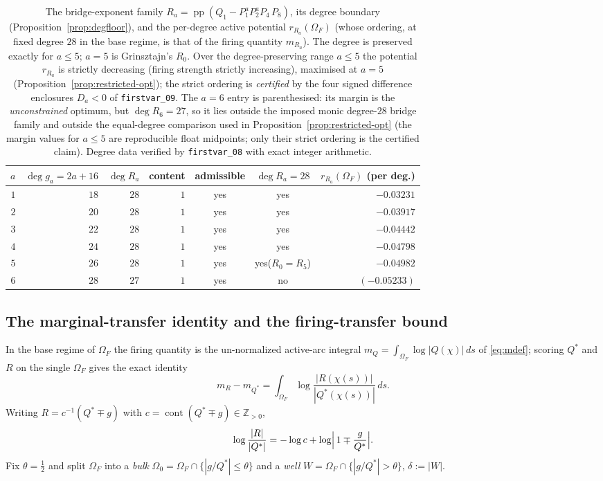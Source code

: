 \documentclass[11pt,reqno]{amsart}
\theoremstyle{plain}
\theoremstyle{definition}
\theoremstyle{remark}
\newcommand{\Z}{\mathbb{Z}}
\DeclareMathOperator{\pp}{pp}
\newcommand{\rb}[1]{r_{#1}}   %
\begin{document}
\begin{table}[ht]
\centering\small
\renewcommand{\arraystretch}{1.2}
\begin{tabular}{@{}rrrrccr@{}}
\toprule
$a$ & $\deg g_a=2a+16$ & $\deg R_a$ & content & admissible & $\deg R_a=28$ & $\rb{R_a}(\Omega_F)$ (per deg.)\\
\midrule
$1$ & $18$ & $28$ & $1$ & yes & yes & $-0.03231$\\
$2$ & $20$ & $28$ & $1$ & yes & yes & $-0.03917$\\
$3$ & $22$ & $28$ & $1$ & yes & yes & $-0.04442$\\
$4$ & $24$ & $28$ & $1$ & yes & yes & $-0.04798$\\
$5$ & $26$ & $28$ & $1$ & yes & yes\quad($R_0=R_5$) & $-0.04982$\\
$6$ & $28$ & $27$ & $1$ & yes & no & $(-0.05233)$\\
\bottomrule
\end{tabular}
\medskip
\caption{The bridge-exponent family $R_a=\pp(Q_1-P_1^aP_2^aP_4\,P_8)$, its degree
boundary (Proposition~\ref{prop:degfloor}), and the per-degree active potential
$\rb{R_a}(\Omega_F)$ (whose ordering, at fixed degree $28$ in the base regime, is that of
the firing quantity $m_{R_a}$). The degree is preserved exactly for $a\le5$; $a=5$ is
Grinsztajn's $R_0$. Over the degree-preserving range $a\le5$ the potential
$\rb{R_a}$ is strictly decreasing (firing strength strictly increasing),
maximised at $a=5$ (Proposition~\ref{prop:restricted-opt}); the strict ordering is
\emph{certified} by the four signed difference enclosures $D_a<0$ of
\texttt{firstvar\_09}. The $a=6$ entry is parenthesised: its margin is the
\emph{unconstrained} optimum, but $\deg R_6=27$, so it lies outside the imposed monic
degree-$28$ bridge family and outside the equal-degree comparison used in
Proposition~\ref{prop:restricted-opt} (the margin values for $a\le5$ are reproducible
float midpoints; only their strict ordering is the certified claim). Degree data
verified by \texttt{firstvar\_08} with
exact integer arithmetic.}
\label{tab:degfloor}
\end{table}

\subsection*{The marginal-transfer identity and the firing-transfer bound}
In the base regime of $\Omega_F$ the firing quantity is the un-normalized active-arc
integral $m_Q=\int_{\Omega_F}\log|Q(\chi)|\,ds$ of \eqref{eq:mdef}; scoring $Q^*$ and $R$
on the single $\Omega_F$ gives the exact identity
\begin{equation}\label{eq:transfer-id}
  m_R-m_{Q^*}=\int_{\Omega_F}\log\frac{|R(\chi(s))|}{|Q^*(\chi(s))|}\,ds .
\end{equation}
Writing $R=c^{-1}(Q^*\mp g)$ with $c=\operatorname{cont}(Q^*\mp g)\in\Z_{>0}$,
\[
  \log\frac{|R|}{|Q^*|}=-\log c+\log\Bigl|\,1\mp\frac{g}{Q^*}\Bigr| .
\]
Fix $\theta=\tfrac12$ and split $\Omega_F$ into a \emph{bulk}
$\Omega_0=\Omega_F\cap\{|g/Q^*|\le\theta\}$ and a \emph{well}
$W=\Omega_F\cap\{|g/Q^*|>\theta\}$, $\delta:=|W|$.
\end{document}
